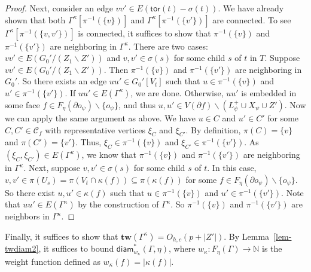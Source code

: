 \documentclass[a4paper,11pt]{article}
\numberwithin{lemma}{section}
\newcommand{\tw}{\mathbf{tw}}
\newcommand{\tor}{\mathsf{tor}}
\begin{document}
\begin{proof}
Next, consider an edge $vv' \in E(\tor(t) - \sigma(t))$.
We have already shown that both $\varGamma^\kappa[\pi^{-1}(\{v\})]$ and $\varGamma^\kappa[\pi^{-1}(\{v'\})]$ are connected.
To see $\varGamma^\kappa[\pi^{-1}(\{v,v'\})]$ is connected, it suffices to show that $\pi^{-1}(\{v\})$ and $\pi^{-1}(\{v'\})$ are neighboring in $\varGamma^\kappa$.
There are two cases: $vv' \in E(G_0'/(Z_1 \backslash Z'))$ and $v,v' \in \sigma(s)$ for some child $s$ of $t$ in $T$.
Suppose $vv' \in E(G_0'/(Z_1 \backslash Z'))$.
Then $\pi^{-1}(\{v\})$ and $\pi^{-1}(\{v'\})$ are neighboring in $G_0'$.
So there exists an edge $uu' \in G_0'[V_t]$ such that $u \in \pi^{-1}(\{v\})$ and $u' \in \pi^{-1}(\{v'\})$.
If $uu' \in E(\varGamma^\kappa)$, we are done.
Otherwise, $uu'$ is embedded in some face $f \in F_\eta(\partial o_{\psi}) \backslash \{o_{\psi}\}$, and thus $u,u' \in V(\partial f) \backslash (L_{\psi}^+ \cup X_{\psi} \cup Z')$.
Now we can apply the same argument as above.
We have $u \in C$ and $u' \in C'$ for some $C,C' \in \mathcal{C}_f$ with representative vertices $\xi_C$ and $\xi_{C'}$.
By definition, $\pi(C) = \{v\}$ and $\pi(C') = \{v'\}$.
Thus, $\xi_C \in \pi^{-1}(\{v\})$ and $\xi_{C'} \in \pi^{-1}(\{v'\})$.
As $(\xi_C,\xi_{C'}) \in E(\varGamma^\kappa)$, we know that $\pi^{-1}(\{v\})$ and $\pi^{-1}(\{v'\})$ are neighboring in $\varGamma^\kappa$.
Next, suppose $v,v' \in \sigma(s)$ for some child $s$ of $t$.
In this case, $v,v' \in \pi(U_s) = \pi(V_t \cap \kappa(f)) \subseteq \pi(\kappa(f))$ for some $f \in F_\eta(\partial o_{\psi}) \backslash \{o_{\psi}\}$.
So there exist $u,u' \in \kappa(f)$ such that $u \in \pi^{-1}(\{v\})$ and $u' \in \pi^{-1}(\{v'\})$.
Note that $uu' \in E(\varGamma^\kappa)$ by the construction of $\varGamma^\kappa$.
So $\pi^{-1}(\{v\})$ and $\pi^{-1}(\{v'\})$ are neighbors in $\varGamma^\kappa$.
\end{proof}

Finally, it suffices to show that $\tw(\varGamma^\kappa) = O_{h,c}(p+|Z'|)$.
By Lemma~\ref{lem-twdiam2}, it suffices to bound $\mathsf{diam}_{w_\kappa}^*(\varGamma,\eta)$, where $w_\kappa: F_\eta(\varGamma) \rightarrow \mathbb{N}$ is the weight function defined as $w_\kappa(f) = |\kappa(f)|$.
\end{document}
